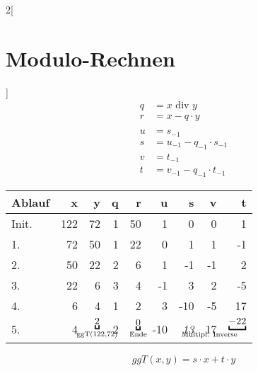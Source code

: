 \begin{multicols}{2}[
	\section{Modulo-Rechnen}
]
	\begin{align*}
		q &= x \text{ div } y \\
		r &= x - q \cdot y \\ \\
		u &= s_{-1} \\
		s &= u_{-1} - q_{-1} \cdot s_{-1} \\
		v &= t_{-1} \\
		t &= v_{-1} - q_{-1} \cdot t_{-1}
	\end{align*}
	
	\begin{tabular}{l | r r r r r r r r }
		Ablauf & x & y & q & r & u & s & v & t \\ \hline
		Init. & 122 & 72 & 1 & 50 & 1 & 0 & 0 & 1 \\
		1. & 72 & 50 & 1 & 22 & 0 & 1 & 1 & -1 \\
		2. & 50 & 22 & 2 & 6 & 1 & -1 & -1 & 2 \\
		3. & 22 & 6 & 3 & 4 & -1 & 3 & 2 & -5 \\
		4. & 6 & 4 & 1 & 2 & 3 & -10 & -5 & 17 \\
		5. & 4 & $\underbracket{2}_{\mathclap{\text{ggT(122,72)}}}$ & 2 & $\underbracket{0}_{\mathclap{\text{Ende}}}$ &
		-10 & 
		\emph{13} & 17 &$\underbracket{-22}_{\mathllap{\text{Multipl. Inverse}}}$
	\end{tabular}
	
	\[
		ggT(x,y) = s \cdot x + t \cdot y
	\]
	
\end{multicols}


